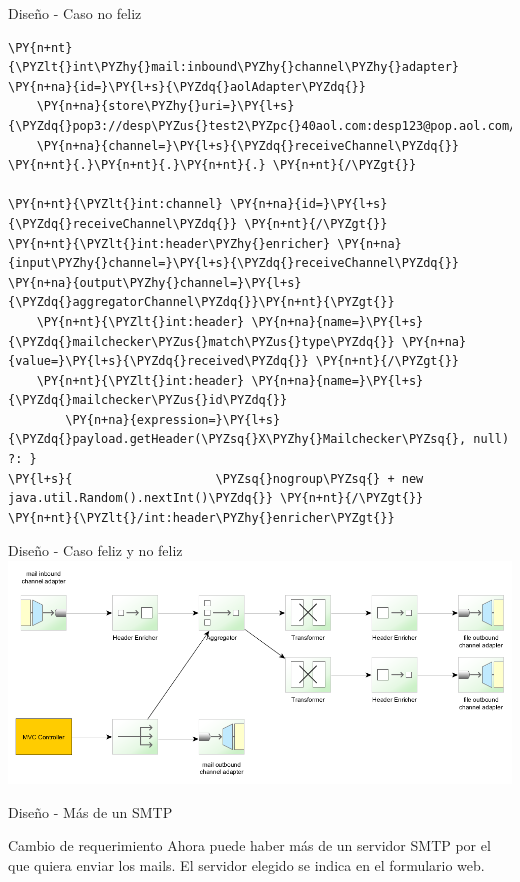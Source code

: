\documentclass{beamer}
\begin{document}
\begin{frame}[fragile]{Diseño - Caso no feliz}
\begin{Verbatim}[fontsize=\tiny,commandchars=\\\{\}]
\PY{n+nt}{\PYZlt{}int\PYZhy{}mail:inbound\PYZhy{}channel\PYZhy{}adapter} \PY{n+na}{id=}\PY{l+s}{\PYZdq{}aolAdapter\PYZdq{}}
    \PY{n+na}{store\PYZhy{}uri=}\PY{l+s}{\PYZdq{}pop3://desp\PYZus{}test2\PYZpc{}40aol.com:desp123@pop.aol.com/INBOX\PYZdq{}}
    \PY{n+na}{channel=}\PY{l+s}{\PYZdq{}receiveChannel\PYZdq{}} \PY{n+nt}{.}\PY{n+nt}{.}\PY{n+nt}{.} \PY{n+nt}{/\PYZgt{}}

\PY{n+nt}{\PYZlt{}int:channel} \PY{n+na}{id=}\PY{l+s}{\PYZdq{}receiveChannel\PYZdq{}} \PY{n+nt}{/\PYZgt{}}
\PY{n+nt}{\PYZlt{}int:header\PYZhy{}enricher} \PY{n+na}{input\PYZhy{}channel=}\PY{l+s}{\PYZdq{}receiveChannel\PYZdq{}} \PY{n+na}{output\PYZhy{}channel=}\PY{l+s}{\PYZdq{}aggregatorChannel\PYZdq{}}\PY{n+nt}{\PYZgt{}}
    \PY{n+nt}{\PYZlt{}int:header} \PY{n+na}{name=}\PY{l+s}{\PYZdq{}mailchecker\PYZus{}match\PYZus{}type\PYZdq{}} \PY{n+na}{value=}\PY{l+s}{\PYZdq{}received\PYZdq{}} \PY{n+nt}{/\PYZgt{}}
    \PY{n+nt}{\PYZlt{}int:header} \PY{n+na}{name=}\PY{l+s}{\PYZdq{}mailchecker\PYZus{}id\PYZdq{}} 
        \PY{n+na}{expression=}\PY{l+s}{\PYZdq{}payload.getHeader(\PYZsq{}X\PYZhy{}Mailchecker\PYZsq{}, null) ?: }
\PY{l+s}{                    \PYZsq{}nogroup\PYZsq{} + new java.util.Random().nextInt()\PYZdq{}} \PY{n+nt}{/\PYZgt{}}
\PY{n+nt}{\PYZlt{}/int:header\PYZhy{}enricher\PYZgt{}}

\end{Verbatim}
\end{frame}

\begin{frame}{Diseño - Caso feliz y no feliz}
\includegraphics[width=1.0\linewidth]{sp-int-12}
\end{frame}

\begin{frame}{Diseño - Más de un SMTP}
\begin{block}{Cambio de requerimiento}
Ahora puede haber más de un servidor SMTP por el que quiera enviar los mails. El servidor elegido se indica en el formulario web.
\end{block}
\end{frame}
\end{document}
